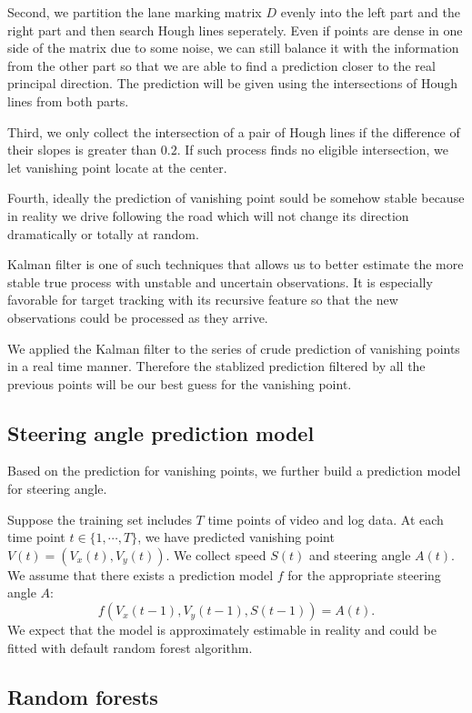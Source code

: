 \documentclass[11pt, oneside]{article}
\begin{document}
Second, we partition the lane marking matrix $D$ evenly into the left part and the right part and then search Hough lines seperately. Even if points are dense in one side of the matrix due to some noise, we can still balance it with the information from the other part so that we are able to find a prediction closer to the real principal direction. The prediction will be given using the intersections of Hough lines from both parts. 

Third, we only collect the intersection of a pair of Hough lines if the difference of their slopes is greater than $0.2$. If such process finds no eligible intersection, we let vanishing point locate at the center. 

Fourth, ideally the prediction of vanishing point sould be somehow stable because in reality we drive following the road which will not change its direction dramatically or totally at random. 

Kalman filter is one of such techniques that allows us to better estimate the more stable true process with unstable and uncertain observations. It is especially favorable for target tracking with its recursive feature so that the new observations could be processed as they arrive. 

We applied the Kalman filter to the series of crude prediction of vanishing points in a real time manner. Therefore the stablized prediction filtered by all the previous points will be our best guess for the vanishing point. 



\subsection*{Steering angle prediction model}

Based on the prediction for vanishing points, we further build a prediction model for steering angle. 

Suppose the training set includes $T$ time points of video and log data. At each time point $t \in \{1, \cdots, T\}$, we have predicted vanishing point $V(t) = (V_x(t), V_y(t))$. We collect speed $S(t)$ and steering angle $A(t)$. We assume that there exists a prediction model $f$ for the appropriate steering angle $A$:
$$
f(V_x(t-1), V_y(t-1), S(t-1)) = A(t).
$$
We expect that the model is approximately estimable in reality and could be fitted with default random forest algorithm. 

\subsection*{Random forests}
\end{document}
